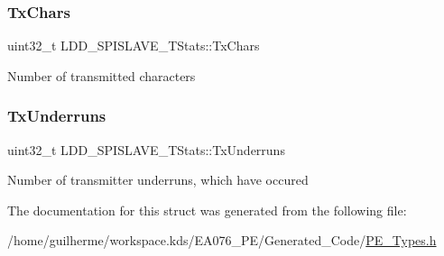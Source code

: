 \subsubsection{\texorpdfstring{Tx\+Chars}{TxChars}}
{\footnotesize\ttfamily uint32\+\_\+t L\+D\+D\+\_\+\+S\+P\+I\+S\+L\+A\+V\+E\+\_\+\+T\+Stats\+::\+Tx\+Chars}

Number of transmitted characters \mbox{\label{struct_l_d_d___s_p_i_s_l_a_v_e___t_stats_ab2e5342f4a486b20ae9306f451451a77}} 
\subsubsection{\texorpdfstring{Tx\+Underruns}{TxUnderruns}}
{\footnotesize\ttfamily uint32\+\_\+t L\+D\+D\+\_\+\+S\+P\+I\+S\+L\+A\+V\+E\+\_\+\+T\+Stats\+::\+Tx\+Underruns}

Number of transmitter underruns, which have occured 

The documentation for this struct was generated from the following file\+:\begin{DoxyCompactItemize}
\item 
/home/guilherme/workspace.\+kds/\+E\+A076\+\_\+\+P\+E/\+Generated\+\_\+\+Code/\hyperlink{_p_e___types_8h}{P\+E\+\_\+\+Types.\+h}\end{DoxyCompactItemize}
